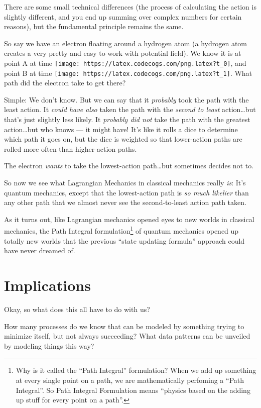 \documentclass[]{article}
\begin{document}
There are some small technical differences (the process of calculating the
action is slightly different, and you end up summing over complex numbers for
certain reasons), but the fundamental principle remains the same.

So say we have an electron floating around a hydrogen atom (a hydrogen atom
creates a very pretty and easy to work with potential field). We know it is at
point A at time \texttt{[image: https://latex.codecogs.com/png.latex?t\_0]}, and
point B at time \texttt{[image: https://latex.codecogs.com/png.latex?t\_1]}. What
path did the electron take to get there?

Simple: We don't know. But we can say that it \emph{probably} took the path with
the least action. It \emph{could have also} taken the path with the \emph{second
to least} action\ldots{}but that's just slightly less likely. It \emph{probably
did not} take the path with the greatest action\ldots{}but who knows --- it
might have! It's like it rolls a dice to determine which path it goes on, but
the dice is weighted so that lower-action paths are rolled more often than
higher-action paths.

The electron \emph{wants} to take the lowest-action path\ldots{}but sometimes
decides not to.

So now we see what Lagrangian Mechanics in classical mechanics really \emph{is}:
It's quantum mechanics, except that the lowest-action path is \emph{so much
likelier} than any other path that we almost never see the second-to-least
action path taken.

As it turns out, like Lagrangian mechanics opened eyes to new worlds in
classical mechanics, the Path Integral formulation\footnote{Why is it called the
  ``Path Integral'' formulation? When we add up something at every single point
  on a path, we are mathematically perfoming a ``Path Integral''. So Path
  Integral Formulation means ``physics based on the adding up stuff for every
  point on a path''.} of quantum mechanics opened up totally new worlds that the
previous ``state updating formula'' approach could have never dreamed of.

\hypertarget{implications}{%
\section{Implications}\label{implications}}

Okay, so what does this all have to do with us?

How many processes do we know that can be modeled by something trying to
minimize itself, but not always succeeding? What data patterns can be unveiled
by modeling things this way?
\end{document}
